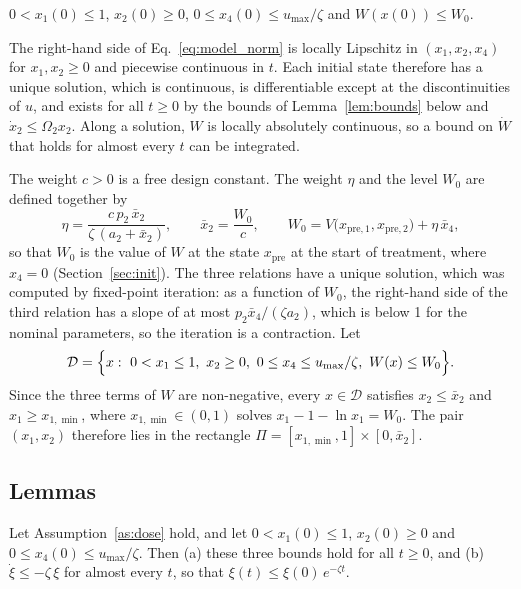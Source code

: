 \begin{assumption}
\label{as:init}
$0<x_1(0)\le1$, $x_2(0)\ge0$, $0\le x_4(0)\le u_{\max}/\zeta$ and $W(x(0))\le W_0$.
\end{assumption}

The right-hand side of Eq.~\eqref{eq:model_norm} is locally Lipschitz in $(x_1,x_2,x_4)$ for $x_1,x_2\ge0$ and piecewise continuous in $t$. Each initial state therefore has a unique solution, which is continuous, is differentiable except at the discontinuities of $u$, and exists for all $t\ge0$ by the bounds of Lemma~\ref{lem:bounds} below and $\dot x_2\le\Omega_2x_2$. Along a solution, $W$ is locally absolutely continuous, so a bound on $\dot W$ that holds for almost every $t$ can be integrated.

The weight $c>0$ is a free design constant. The weight $\eta$ and the level $W_0$ are defined together by
\begin{equation}
\eta=\frac{c\,p_2\,\bar x_2}{\zeta\,(a_2+\bar x_2)},\qquad \bar x_2=\frac{W_0}{c},\qquad
W_0=V\bigl(x_{\mathrm{pre},1},x_{\mathrm{pre},2}\bigr)+\eta\,\bar x_4 ,
\label{eq:lyap_eta}
\end{equation}
so that $W_0$ is the value of $W$ at the state $x_{\mathrm{pre}}$ at the start of treatment, where $x_4=0$ (Section~\ref{sec:init}). The three relations have a unique solution, which was computed by fixed-point iteration: as a function of $W_0$, the right-hand side of the third relation has a slope of at most $p_2\bar x_4/(\zeta a_2)$, which is below 1 for the nominal parameters, so the iteration is a contraction. Let
\begin{equation}
\mathcal D=\Bigl\{x:\ 0<x_1\le1,\ x_2\ge0,\ 0\le x_4\le u_{\max}/\zeta,\ W(x)\le W_0\Bigr\}.
\end{equation}
Since the three terms of $W$ are non-negative, every $x\in\mathcal D$ satisfies $x_2\le\bar x_2$ and $x_1\ge x_{1,\min}$, where $x_{1,\min}\in(0,1)$ solves $x_1-1-\ln x_1=W_0$. The pair $(x_1,x_2)$ therefore lies in the rectangle $\Pi=[x_{1,\min},1]\times[0,\bar x_2]$.

\subsection{Lemmas}

\begin{lemma}
\label{lem:bounds}
Let Assumption~\ref{as:dose} hold, and let $0<x_1(0)\le1$, $x_2(0)\ge0$ and $0\le x_4(0)\le u_{\max}/\zeta$. Then (a) these three bounds hold for all $t\ge0$, and (b) $\dot\xi\le-\zeta\,\xi$ for almost every $t$, so that $\xi(t)\le\xi(0)\,e^{-\zeta t}$.
\end{lemma}

